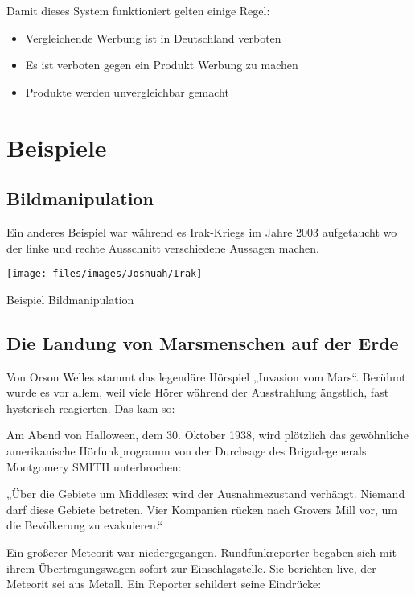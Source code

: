 Damit dieses System funktioniert gelten einige Regel:
\begin{itemize}
	\item Vergleichende Werbung ist in Deutschland verboten
	\item Es ist verboten gegen ein Produkt Werbung zu machen
	\item Produkte werden unvergleichbar gemacht
\end{itemize}

\section{Beispiele}

\subsection{Bildmanipulation}
Ein anderes Beispiel war während es Irak-Kriegs im Jahre 2003 aufgetaucht wo der linke und rechte
Ausschnitt verschiedene Aussagen machen.

\begin{figurewrapper}
	\texttt{[image: files/images/Joshuah/Irak]}
	\caption{Beispiel Bildmanipulation}
\end{figurewrapper}


\subsection{Die Landung von Marsmenschen auf der Erde}
Von Orson Welles stammt das legendäre Hörspiel „Invasion vom Mars“. Berühmt wurde es vor allem, weil
viele Hörer während der Ausstrahlung ängstlich, fast hysterisch reagierten. Das kam so:

Am Abend von Halloween, dem 30. Oktober 1938, wird plötzlich das gewöhnliche amerikanische
Hörfunkprogramm von der Durchsage des Brigadegenerals Montgomery SMITH unterbrochen:

„Über die Gebiete um Middlesex wird der Ausnahmezustand verhängt. Niemand darf diese Gebiete
betreten. Vier Kompanien rücken nach Grovers Mill vor, um die Bevölkerung zu evakuieren.“

Ein größerer Meteorit war niedergegangen. Rundfunkreporter begaben sich mit ihrem Übertragungswagen
sofort zur Einschlagstelle. Sie berichten live, der Meteorit sei aus Metall. Ein Reporter schildert
seine Eindrücke:

